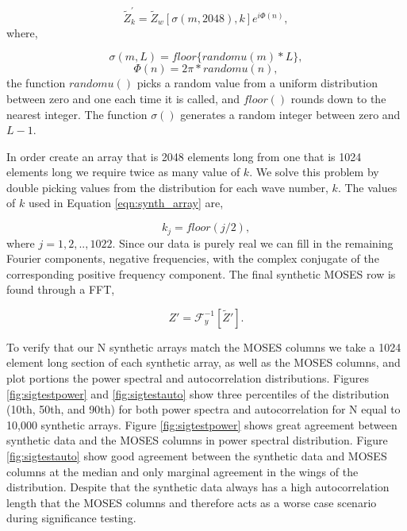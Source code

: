 \documentclass[]{solarphysics}
\begin{document}
\begin{article}
	\begin{equation}
		\widetilde{Z}_k^{'} = \widetilde{Z}_w\left[\sigma(m,2048), k  \right]e^{i\Phi(n)} ,
		\label{eqn:synth_array}
	\end{equation}
	where,
	
	\begin{equation}
		\sigma(m,L) = floor\{randomu(m)*L\} ,
	\end{equation}
	\begin{equation}
		\Phi(n) = 2\pi * randomu(n),
	\end{equation}
	the function $randomu()$ picks a random value from a uniform distribution between zero and one each time it is called, and $floor()$ rounds down to the nearest integer.  The function $\sigma()$ generates a random integer between zero and $L-1$.  
	
	In order create an array that is 2048 elements long from one that is 1024 elements long we require twice as many value of $k$.  We solve this problem by double picking values from the distribution for each wave number, $k$.  The values of $k$ used in Equation \ref{eqn:synth_array} are,
	
	\begin{equation}
		k_j = floor(j/2),
	\end{equation}
	where $j = 1,2,..,1022.$ Since our data is purely real we can fill in the remaining Fourier components,  negative frequencies, with the complex conjugate of the corresponding positive frequency component.  The final synthetic MOSES row is found through a FFT, 
	
	\begin{equation}
		Z' = \mathcal{F}_y^{-1}[\widetilde{Z}'].
	\end{equation}
	
	To verify that our N synthetic arrays match the MOSES columns we take a 1024 element long section of each synthetic array, as well as the MOSES columns, and plot portions the power spectral and autocorrelation distributions. Figures \ref{fig:sigtestpower} and \ref{fig:sigtestauto}  show three percentiles of the distribution (10th, 50th, and 90th) for both power spectra and autocorrelation for N equal to 10,000 synthetic arrays. Figure \ref{fig:sigtestpower} shows great agreement between synthetic data and the MOSES columns in power spectral distribution.  Figure \ref{fig:sigtestauto} show good agreement between the synthetic data and MOSES columns at the median and only marginal agreement in the wings of the distribution.  Despite that the synthetic data always has a high autocorrelation length that the MOSES columns and therefore acts as a worse case scenario during significance testing.  
		

\end{article}
\end{document}
